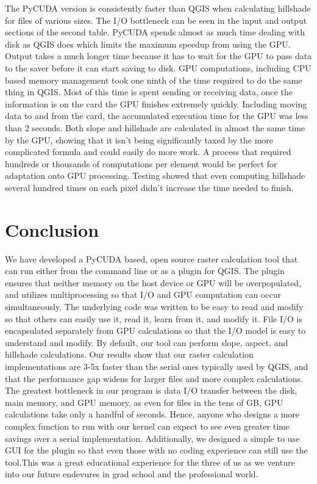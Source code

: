 \documentclass[journal]{IEEEtran}
\begin{document}
The PyCUDA version is consistently faster than QGIS when calculating hillshade
for files of various sizes. The I/O bottleneck  can be seen in the input and
output sections of the second table. PyCUDA spends almost as much time dealing
with disk as QGIS does which limits the maximum speedup from using the GPU.
Output takes a much longer time because it has to wait for the GPU to pass data
to the saver before it can start saving to disk.  GPU computations, including
CPU based memory management took one ninth of the time required to do the
same thing in QGIS. Most of this time is spent sending or receiving data, once
the information is on the card the GPU finishes extremely quickly. Including
moving data to and from the card, the accumulated execution time for the GPU
was less than 2 seconds.  Both slope and hillshade are calculated in almost the
same time by the GPU, showing that it isn't being significantly taxed by the
more complicated formula and could easily do more work.  A process that
required hundreds or thousands of computations per element would be perfect for
adaptation onto GPU processing. Testing showed that even computing hillshade
several hundred times on each pixel didn't increase the time needed to finish.


\section{Conclusion}
We have developed a PyCUDA based, open source raster calculation tool that can
run either from the command line or as a plugin for QGIS. The plugin ensures
that neither memory on the host device or GPU will be overpopulated, and
utilizes multiprocessing so that I/O and GPU computation can occur
simultaneously. The underlying code was written to be easy to read and modify
so that others can easily use it, read it, learn from it, and modify it. File
I/O is encapsulated separately from GPU calculations so that the I/O model is
easy to understand and modify. By default, our tool can perform slope, aspect,
and hillshade calculations. Our results show that our raster calculation
implementations are 3-5x faster than the serial ones typically used by QGIS, and
that the performance gap widens for larger files and more complex calculations.
The greatest bottleneck in our program is data I/O transfer between the disk,
main memory, and GPU memory, as even for files in the tens of GB, GPU
calculations take only a handful of seconds.  Hence, anyone who designs a more
complex function to run with our kernel can expect to see even greater time
savings over a serial implementation. Additionally, we designed a simple to use
GUI for the plugin so that even those with no coding experience can still use
the tool.This was a great educational experience for the three of us as we 
venture into our future endevures in grad school and the professional world.
\end{document}
